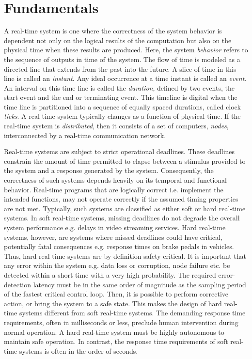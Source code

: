 \chapter{Fundamentals}
\label{ch:Fundamentals}

A real-time system \cite{liu2000real} is one where the correctness of the system behavior is dependent not only on the logical results of the computation but also on the physical time when these results are produced. Here, the system \emph{behavior} refers to the sequence of outputs in time of the system. The flow of time is modeled as a directed line that extends from the past into the future. A slice of time in this line is called an \emph{instant}. Any ideal occurrence at a time instant is called an \emph{event}. An interval on this time line is called the \emph{duration}, defined by two events, the start event and the end or terminating event. This timeline is digital when the time line is partitioned into a sequence of equally spaced durations, called clock \emph{ticks}. A real-time system typically changes as a function of physical time. If the real-time system is \emph{distributed}, then it consists of a set of computers, \emph{nodes}, interconnected by a real-time communication network.

Real-time systems are subject to strict operational deadlines. These deadlines constrain the amount of time permitted to elapse between a stimulus provided to the system and a response generated by the system. Consequently, the correctness of such systems depends heavily on its temporal and functional behavior. Real-time programs that are logically correct i.e. implement the intended functions, may not operate correctly if the assumed timing properties are not met. Typically, such systems are classified as either soft or hard real-time systems. In soft real-time systems, missing deadlines do not degrade the overall system performance e.g. delays in video streaming services. Hard real-time systems, however, are systems where missed deadlines could have critical, potentially fatal consequences e.g. response times on brake pedals in vehicles. Thus, hard real-time systems are by definition safety critical. It is important that any error within the system e.g. data loss or corruption, node failure etc. be detected within a short time with a very high probability. The required error-detection latency must be in the same order of magnitude as the sampling period of the fastest critical control loop. Then, it is possible to perform corrective action, or bring the system to a safe state. This makes the design of hard real-time systems different from soft real-time systems. The demanding response time requirements, often in milliseconds or less, preclude human intervention during normal operation. A hard real-time system must be highly autonomous to maintain safe operation. In contrast, the response time requirements of soft real-time systems is often in the order of seconds. 

